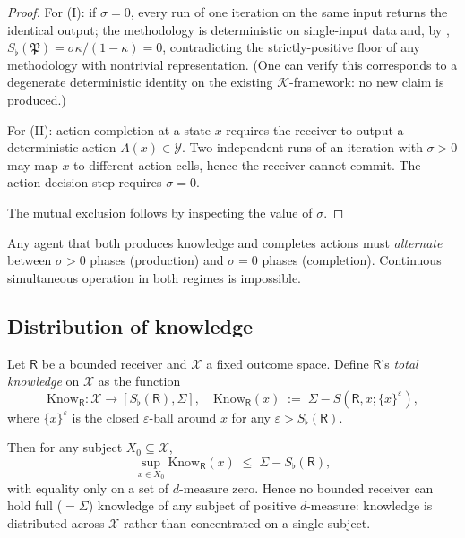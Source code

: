 \documentclass[twocolumn,11pt,a4paper]{article}
\newcommand{\K}{\mathcal{K}}
\newcommand{\X}{\mathcal{X}}
\newcommand{\Y}{\mathcal{Y}}
\newcommand{\Method}{\mathfrak{P}}
\newcommand{\receiver}{\mathsf{R}}
\newcommand{\Sfloor}{S_{\flat}}
\newcommand{\eps}{\varepsilon}
\begin{document}
\begin{proof}
For (I): if $\sigma=0$, every run of one iteration on the same input
returns the identical output; the methodology is deterministic on
single-input data and, by ,
$\Sfloor(\Method)=\sigma\kappa/(1-\kappa)=0$, contradicting the
strictly-positive floor of any methodology with nontrivial
representation. (One can verify this corresponds to a degenerate
deterministic identity on the existing $\K$-framework: no new claim is
produced.)

For (II): action completion at a state $x$ requires the receiver to
output a deterministic action $A(x)\in\Y$. Two independent runs of an
iteration with $\sigma>0$ may map $x$ to different action-cells, hence
the receiver cannot commit. The action-decision step requires
$\sigma=0$.

The mutual exclusion follows by inspecting the value of $\sigma$.
\end{proof}

\begin{corollary}\label{cor:alternation}
Any agent that both produces knowledge and completes actions must
\emph{alternate} between $\sigma>0$ phases (production) and $\sigma=0$
phases (completion). Continuous simultaneous operation in both regimes
is impossible.
\end{corollary}

\subsection{Distribution of knowledge}

\begin{theorem}\label{thm:distribution}
Let $\receiver$ be a bounded receiver and $\X$ a fixed outcome space.
Define $\receiver$'s \emph{total knowledge} on $\X$ as the function
\[
\mathrm{Know}_{\receiver}:\X\to[\Sfloor(\receiver),\Sigma],
\quad
\mathrm{Know}_{\receiver}(x)\;:=\;\Sigma-S(\receiver,x;\{x\}^{\eps}),
\]
where $\{x\}^{\eps}$ is the closed $\eps$-ball around $x$ for any
$\eps>\Sfloor(\receiver)$.

Then for any subject $X_0\subseteq\X$,
\[
\sup_{x\in X_0}\mathrm{Know}_{\receiver}(x)\;\le\;\Sigma-\Sfloor(\receiver),
\]
with equality only on a set of $d$-measure zero. Hence no bounded
receiver can hold full ($=\Sigma$) knowledge of any subject of positive
$d$-measure: knowledge is distributed across $\X$ rather than concentrated
on a single subject.
\end{theorem}
\end{document}
